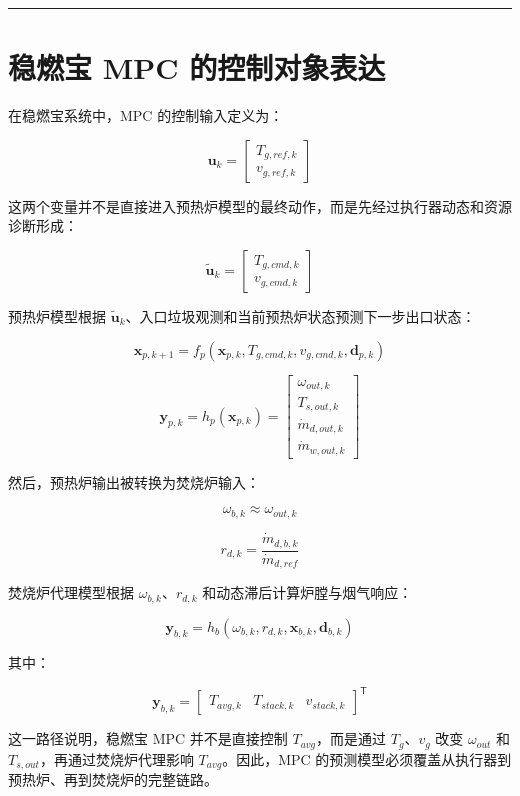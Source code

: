 \documentclass[UTF8,openany,zihao=-4,oneside]{ctexbook}
\newcommand{\manualdivider}{\par\vspace{0.6em}\noindent\textcolor{FGLine}{\rule{\linewidth}{0.7pt}}\vspace{0.6em}\par}
\begin{document}
\manualdivider

\section{稳燃宝 MPC 的控制对象表达}\label{sec:flameguard-mpc-expression}

在稳燃宝系统中，MPC 的控制输入定义为：

\[
\mathbf{u}_k=
\begin{bmatrix}
T_{g,ref,k}\\
v_{g,ref,k}
\end{bmatrix}
\]

这两个变量并不是直接进入预热炉模型的最终动作，而是先经过执行器动态和资源诊断形成：

\[
\tilde{\mathbf{u}}_k=
\begin{bmatrix}
T_{g,cmd,k}\\
v_{g,cmd,k}
\end{bmatrix}
\]

预热炉模型根据 \(\tilde{\mathbf{u}}_k\)、入口垃圾观测和当前预热炉状态预测下一步出口状态：

\[
\mathbf{x}_{p,k+1}=f_p\left(\mathbf{x}_{p,k},T_{g,cmd,k},v_{g,cmd,k},\mathbf{d}_{p,k}\right)
\]

\[
\mathbf{y}_{p,k}=h_p\left(\mathbf{x}_{p,k}\right)=
\begin{bmatrix}
\omega_{out,k}\\
T_{s,out,k}\\
\dot m_{d,out,k}\\
\dot m_{w,out,k}
\end{bmatrix}
\]

然后，预热炉输出被转换为焚烧炉输入：

\[
\omega_{b,k}\approx \omega_{out,k}
\]

\[
r_{d,k}=\frac{\dot m_{d,b,k}}{\dot m_{d,ref}}
\]

焚烧炉代理模型根据 \(\omega_{b,k}\)、\(r_{d,k}\) 和动态滞后计算炉膛与烟气响应：

\[
\mathbf{y}_{b,k}=h_b\left(\omega_{b,k},r_{d,k},\mathbf{x}_{b,k},\mathbf{d}_{b,k}\right)
\]

其中：

\[
\mathbf{y}_{b,k}=\begin{bmatrix}T_{avg,k} & T_{stack,k} & v_{stack,k}\end{bmatrix}^\mathsf{T}
\]

这一路径说明，稳燃宝 MPC 并不是直接控制 \(T_{avg}\)，而是通过 \(T_g\)、\(v_g\) 改变 \(\omega_{out}\) 和 \(T_{s,out}\)，再通过焚烧炉代理影响 \(T_{avg}\)。因此，MPC 的预测模型必须覆盖从执行器到预热炉、再到焚烧炉的完整链路。
\end{document}
